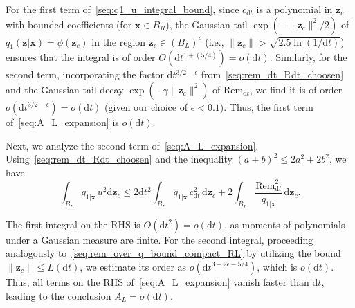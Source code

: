 \documentclass[
 longbibliography,
 twocolumn,
 superscriptaddress,
 amsmath,
 amssymb,
 amsthm,
 amsfonts,
 prl,
 floatfix,
]{revtex4-2}
\begin{document}
\begin{widetext}
For the first term of~\eqref{seq:q1_u_integral_bound}, since $c_{\mathrm dt}$ is a polynomial in $\bm z_c$ with bounded coefficients (for $\bm x\in B_R$), the Gaussian tail $\exp(-\|\bm z_c\|^2/2)$ of $q_1(\bm z|\bm x)=\phi(\bm z_c)$ in the region $\bm z_c\in (B_L)^c$ (i.e., $\|\bm z_c\|>\sqrt{2.5\ln(1/\mathrm dt)}$) ensures that the integral is of order $O(\mathrm dt^{1+(5/4)})=o(\mathrm dt)$. Similarly, for the second term, incorporating the factor $\mathrm dt^{3/2-\epsilon}$ from~\eqref{seq:rem_dt_Rdt_choosen} and the Gaussian tail decay $\exp(-\gamma\|\bm z_c\|^2)$ of $\mathrm{Rem}_{\mathrm dt}$, we find it is of order $o(\mathrm dt^{3/2-\epsilon})=o(\mathrm dt)$ (given our choice of $\epsilon<0.1$). Thus, the first term of~\eqref{seq:A_L_expansion} is $o(\mathrm dt)$.

Next, we analyze the second term of~\eqref{seq:A_L_expansion}. Using~\eqref{seq:rem_dt_Rdt_choosen} and the inequality $(a+b)^2\leq2a^2+2b^2$, we have
\begin{equation*}
    \int_{B_L}q_{1|\bm x}\,u^2\mathrm d\bm z_c
    \leq2\mathrm dt^2\!\int_{B_L}q_{1|\bm x}\,c_{\mathrm dt}^2\,\mathrm d\bm z_c
    +2\int_{B_L}\frac{\mathrm{Rem}_{\mathrm dt}^2}{q_{1|\bm x}}\,\mathrm d\bm z_c.
\end{equation*}

The first integral on the RHS is $O(\mathrm dt^2)=o(\mathrm dt)$, as moments of polynomials under a Gaussian measure are finite. For the second integral, proceeding analogously to~\eqref{seq:rem_over_q_bound_compact_RL} by utilizing the bound $\|\bm z_c\|\leq L(\mathrm dt)$, we estimate its order as $o(\mathrm dt^{3-2\epsilon-5/4})$, which is $o(\mathrm dt)$. Thus, all terms on the RHS of~\eqref{seq:A_L_expansion} vanish faster than $\mathrm dt$, leading to the conclusion $A_L=o(\mathrm dt)$.


\end{widetext}
\end{document}
